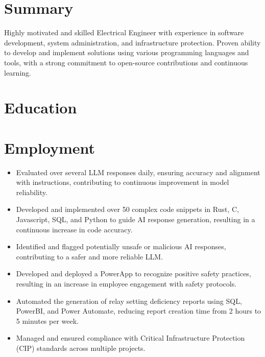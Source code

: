 \documentclass{lsanche_cv}
\begin{document}

\medskip


\smallskip


\section{Summary}
Highly motivated and skilled Electrical Engineer with experience in software development, system administration, and infrastructure protection. Proven ability to develop and implement solutions using various programming languages and tools, with a strong commitment to open-source contributions and continuous learning.

\section{Education}

\section{Employment}
\begin{itemize}
\item Evaluated over several LLM responses daily, ensuring accuracy and alignment with instructions, contributing to continuous improvement in model reliability.
\item Developed and implemented over 50 complex code snippets in Rust, C, Javascript, SQL, and Python to guide AI response generation, resulting in a continuous increase in code accuracy.
\item Identified and flagged potentially unsafe or malicious AI responses, contributing to a safer and more reliable LLM.
\end{itemize}

\divider

\begin{itemize}
\item Developed and deployed a PowerApp to recognize positive safety practices, resulting in an increase in employee engagement with safety protocols.
\item Automated the generation of relay setting deficiency reports using SQL, PowerBI, and Power Automate, reducing report creation time from 2 hours to 5 minutes per week.
\item Managed and ensured compliance with Critical Infrastructure Protection (CIP) standards across multiple projects.
\end{itemize}
\end{document}
